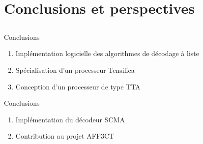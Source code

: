 \section{Conclusions et perspectives}
\subsection*{}

\begin{frame}[c]{Conclusions}

  \begin{enumerate}
\renewcommand{\section}[2]{} %

    \renewcommand*{\bibfont}{\scriptsize}
    \nocite{leonardon_fast_2017,ghaffari_improving_2017,leonardon_tta_2018,Ghaffari2018,cassagne_fast_2017,cassagne_gdr_2017}
    \vfill
    \item<+-> Implémentation logicielle des algorithmes de décodage à liste
    \scriptsize{\printbibliography[keyword={fast-scl} ]}
    \vfill
    \item<+-> Spécialisation d'un processeur Tensilica
    \scriptsize{\printbibliography[keyword={leonardon}]}
    \vfill
    \item<+-> Conception d'un processeur de type TTA
    \scriptsize{\printbibliography[keyword={tta}]}
    \vfill
  \end{enumerate}

\end{frame}

\begin{frame}[c]{Conclusions}

  \begin{enumerate}
\renewcommand{\section}[2]{} %

    \renewcommand*{\bibfont}{\scriptsize}
    \nocite{leonardon_fast_2017,ghaffari_improving_2017,leonardon_tta_2018,Ghaffari2018,cassagne_fast_2017,cassagne_gdr_2017}
    \vfill
    \item<+-> Implémentation du décodeur SCMA
    \printbibliography[keyword={ghaffari}]
    \vfill
    \item<+-> Contribution au projet AFF3CT
    \printbibliography[keyword={aff3ct}]
    \vfill
  \end{enumerate}

\end{frame}

